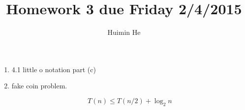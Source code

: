 \documentclass[a4paper]{article}
\title{Homework 3 due Friday 2/4/2015}
\author{Huimin He}
\begin{document}
\maketitle

\begin{enumerate}
\item 4.1 little o notation part (c)

\item fake coin problem.

\[T(n) \leq T(n/2) + \log_2{n}\]

\begin{equation*}
\end{equation*}

\end{enumerate}
\end{document}
